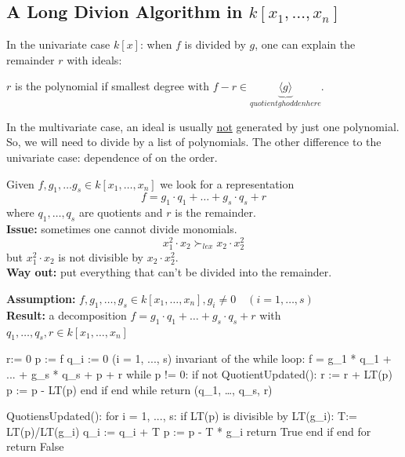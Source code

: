 \subsection{A Long Divion Algorithm in $k[x_1, \dots, x_n]$} 

In the univariate case $k[x]$: when $f$ is divided by $g$, one can explain the remainder $r$ with ideals: 
\begin{center}
    $r$ is the polynomial if smallest degree with $f-r \in \underbrace{\langle g \rangle}_{quotient g hodden here}$.  \\
\end{center}

In the multivariate case, an ideal is usually \underline{not} generated by  just one polynomial. So, we will need to divide by a list of polynomials. 
The other difference to the univariate case: dependence of on the order. 

Given $f,g_1, \ldots g_s \in k[x_1, \dots, x_n]$ we look for a representation 
\[f = g_1 \cdot  q_1 + \ldots + g_s \cdot q_s + r\]
where $q_1, \ldots, q_s$ are quotients and $r$ is the remainder. \\[0.5em]
\textbf{Issue:} sometimes one cannot divide monomials. 
\[x_1^2 \cdot x_2 \succ_{lex} x_2 \cdot x_2^2\] 
but $x_1^2 \cdot x_2$ is not divisible by $x_2 \cdot x_2^2$. \\[0.5em]
\textbf{Way out:} put everything that can't be divided into the remainder. 

\clearpage 

\begin{algorithm} [title = Multivariate Division Algorithm]
    \textbf{Assumption:} $f, g_1, \ldots, g_s \in k[x_1, \dots, x_n], g_i \neq 0 \quad (i = 1, \ldots, s)$  \\
    \textbf{Result:} a decomposition $f = g_1 \cdot q_1 + \ldots + g_s \cdot q_s + r$ with $q_1, \ldots, q_s, r \in k[x_1, \dots, x_n]$ 
    
\begin{lstpseudo}
r:= 0      %
p := f     %
q_i := 0 (i = 1, ..., s)   %
invariant of the while loop: f = g_1 * q_1 + ... + g_s * q_s + p + r
while p != 0: 
    if not QuotientUpdated():
        r := r + LT(p) 
        p := p - LT(p) 
    end if 
  end while
return (q_1, \ldots, q_s, r)  

QuotiensUpdated():  %
    for i = 1, ..., s: 
        if LT(p) is divisible by LT(g_i): 
            T:= LT(p)/LT(g_i) 
            q_i := q_i + T
            p := p - T * g_i
            return True
        end if 
    end for 
    return False
\end{lstpseudo}
\end{algorithm} 

